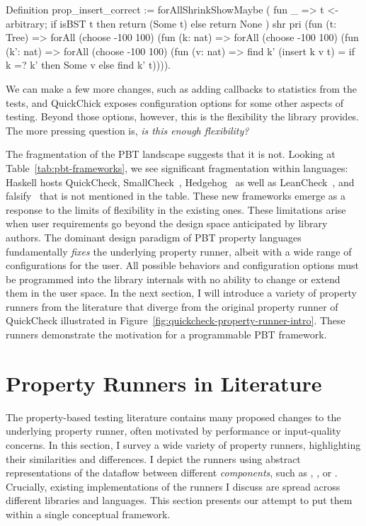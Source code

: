 \begin{code}[language=Rocq]
Definition prop_insert_correct :=
  forAllShrinkShowMaybe (
    fun _ =>
      t <- arbitrary;
      if isBST t
        then return (Some t)
        else return None
  ) shr pri (fun (t: Tree) =>
  forAll (choose -100 100)   (fun (k: nat)  =>
  forAll (choose -100 100)   (fun (k': nat) =>
  forAll (choose -100 100)   (fun (v: nat)  =>
    find k' (insert k v t) = if k =? k' then Some v
                             else find k' t)))).
\end{code}

We can make a few more changes, such as adding callbacks to  statistics
from the tests, and QuickChick exposes configuration options for some other aspects of
testing. Beyond those options, however, this is the flexibility the library provides.
The more pressing question is, \emph{is this enough flexibility?}



The fragmentation of the PBT landscape suggests that it is not. Looking at
Table~\ref{tab:pbt-frameworks}, we see significant fragmentation within languages:
Haskell hosts QuickCheck, SmallCheck~\cite{RuncimanNL08}, Hedgehog~\cite{Hedgehog} as
well as LeanCheck~\cite{leancheck}, and falsify~\cite{falsify} that is not mentioned in
the table. These new frameworks emerge as a response to the limits of flexibility in
the existing ones. These limitations arise when user requirements go beyond the design
space anticipated by library authors. The dominant design paradigm of PBT property
languages fundamentally \emph{fixes} the underlying property runner, albeit with a wide
range of configurations for the user. All possible behaviors and configuration options
must be programmed into the library internals with no ability to change or extend them
in the user space. In the next section, I will introduce a variety of property runners
from the literature that diverge from the original property runner of QuickCheck
illustrated in Figure~\ref{fig:quickcheck-property-runner-intro}. These runners
demonstrate the motivation for a programmable PBT framework.

\section{Property Runners in Literature}\label{sec:runners}

The property-based testing literature contains many proposed changes to the underlying
property runner, often motivated by performance or input-quality concerns. In this
section, I survey a wide variety of property runners, highlighting their similarities
and differences. I depict the runners using abstract representations of the dataflow
between different \emph{components}, such as ,
, or .
%
Crucially, existing implementations of the runners I discuss are spread across
different libraries and languages. This section presents our attempt to put them within
a single conceptual framework.

